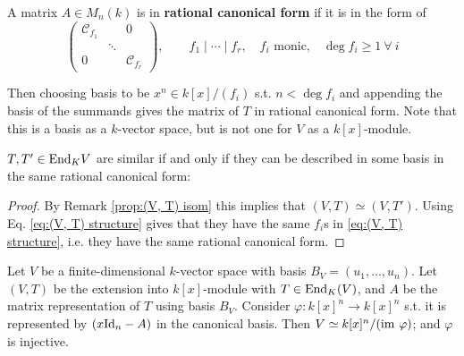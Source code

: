 \documentclass{article}
\begin{document}
\begin{definition}
    A matrix $A\in M_n(k)$ is in \textbf{rational canonical form} if it is in the form of
    \[
        \begin{pmatrix}
            \mathcal{C}_{f_1} & & 0 \\
            & \ddots & \\
            0 & & \mathcal{C}_{f_r}
        \end{pmatrix}, \qquad f_1\mid \cdots \mid f_r,\quad f_i \text{ monic,}\quad \deg f_i \geq 1\ \forall\ i
    \]
\end{definition}

Then choosing basis to be $x^n \in k[x]/(f_i)$ s.t. $n < \deg f_i$ and appending the basis of the summands gives the matrix of $T$ in rational canonical form. Note that this is a basis as a $k$-vector space, but is not one for $V$ as a $k[x]$-module. 

\begin{remark}
    $T, T'\in\mathrm{End}_K{V}$ are similar if and only if they can be described in some basis in the same rational canonical form:
\end{remark}

\begin{proof}
    By Remark \ref{prop:(V, T) isom} this implies that $(V, T) \simeq (V, T')$. Using Eq. \eqref{eq:(V, T) structure} gives that they have the same $f_i$s in \eqref{eq:(V, T) structure}, i.e. they have the same rational canonical form.
\end{proof}

\begin{proposition}
    Let $V$ be a finite-dimensional $k$-vector space with basis $B_V = (u_1, \ldots , u_n)$. Let $(V, T)$ be the extension into $k[x]$-module with $T\in\mathrm{End}_K(V)$, and $A$ be the matrix representation of $T$ using basis $B_V$. Consider $\varphi: k[x]^n \to k[x]^n$ s.t. it is represented by $(x\mathrm{Id}_n - A)$ in the canonical basis. Then $V \simeq k[x]^n/(\mathrm{im}\  \varphi)$; and $\varphi$ is injective. 
\end{proposition}
\end{document}
